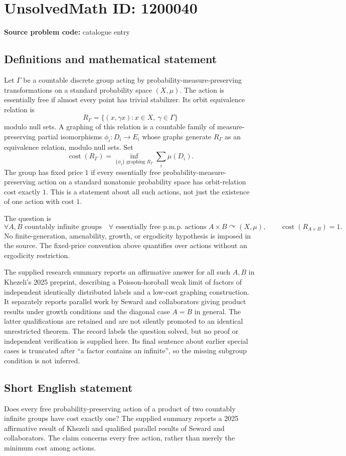 \documentclass[11pt]{article}
\begin{document}
\section*{UnsolvedMath ID: 1200040}
\textbf{Source problem code:} catalogue entry
\subsection{Definitions and mathematical statement}
Let $\Gamma$ be a countable discrete group acting by probability-measure-preserving transformations on a standard probability space $(X,\mu)$. The action is essentially free if almost every point has trivial stabilizer. Its orbit equivalence relation is
\[
R_\Gamma=\{(x,\gamma x):x\in X,\ \gamma\in\Gamma\}
\]
modulo null sets. A graphing of this relation is a countable family of measure-preserving partial isomorphisms $\phi_i:D_i\to E_i$ whose graphs generate $R_\Gamma$ as an equivalence relation, modulo null sets. Set
\[
\operatorname{cost}(R_\Gamma)=\inf_{\{\phi_i\}\text{ graphing }R_\Gamma}\sum_i\mu(D_i).
\]
The group has fixed price $1$ if every essentially free probability-measure-preserving action on a standard nonatomic probability space has orbit-relation cost exactly $1$. This is a statement about all such actions, not just the existence of one action with cost $1$.

The question is
\[
\forall A,B\text{ countably infinite groups}\quad
\forall\text{ essentially free p.m.p. actions }A\times B\curvearrowright(X,\mu),
\qquad \operatorname{cost}(R_{A\times B})=1.
\]
No finite-generation, amenability, growth, or ergodicity hypothesis is imposed in the source. The fixed-price convention above quantifies over actions without an ergodicity restriction.

The supplied research summary reports an affirmative answer for all such $A,B$ in Khezeli's 2025 preprint, describing a Poisson-horoball weak limit of factors of independent identically distributed labels and a low-cost graphing construction. It separately reports parallel work by Seward and collaborators giving product results under growth conditions and the diagonal case $A=B$ in general. The latter qualifications are retained and are not silently promoted to an identical unrestricted theorem. The record labels the question solved, but no proof or independent verification is supplied here. Its final sentence about earlier special cases is truncated after ``a factor contains an infinite'', so the missing subgroup condition is not inferred.
\subsection{Short English statement}
Does every free probability-preserving action of a product of two countably infinite groups have cost exactly one? The supplied summary reports a 2025 affirmative result of Khezeli and qualified parallel results of Seward and collaborators. The claim concerns every free action, rather than merely the minimum cost among actions.
\end{document}
